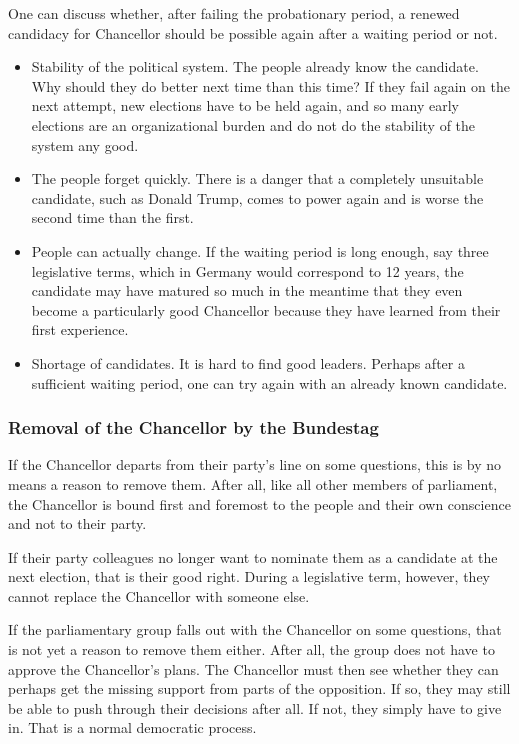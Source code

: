 One can discuss whether, after failing the probationary period, a renewed candidacy for Chancellor should be possible again after a waiting period or not.


\begin{itemize}
  \item Stability of the political system. The people already know the candidate. Why should they do better next time than this time? If they fail again on the next attempt, new elections have to be held again, and so many early elections are an organizational burden and do not do the stability of the system any good.
  \item The people forget quickly. There is a danger that a completely unsuitable candidate, such as Donald Trump, comes to power again and is worse the second time than the first.
\end{itemize}

\begin{itemize}
  \item People can actually change. If the waiting period is long enough, say three legislative terms, which in Germany would correspond to 12 years, the candidate may have matured so much in the meantime that they even become a particularly good Chancellor because they have learned from their first experience.
  \item Shortage of candidates. It is hard to find good leaders. Perhaps after a sufficient waiting period, one can try again with an already known candidate.
\end{itemize}

\subsubsection{Removal of the Chancellor by the Bundestag}\label{subsubsec:removal_by_bundestag}
If the Chancellor departs from their party's line on some questions, this is by no means a reason to remove them.
After all, like all other members of parliament, the Chancellor is bound first and foremost to the people and their own conscience and not to their party.

If their party colleagues no longer want to nominate them as a candidate at the next election, that is their good right.
During a legislative term, however, they cannot replace the Chancellor with someone else.

If the parliamentary group falls out with the Chancellor on some questions, that is not yet a reason to remove them either.
After all, the group does not have to approve the Chancellor's plans.
The Chancellor must then see whether they can perhaps get the missing support from parts of the opposition.
If so, they may still be able to push through their decisions after all.
If not, they simply have to give in.
That is a normal democratic process.

